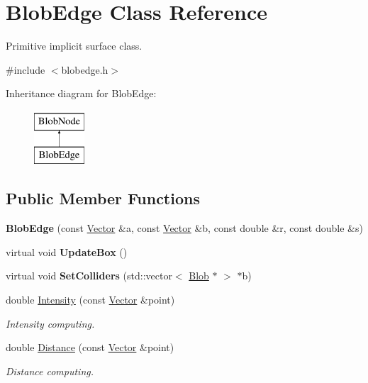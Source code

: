 \hypertarget{class_blob_edge}{
\section{BlobEdge Class Reference}
\label{class_blob_edge}
}


Primitive implicit surface class.  




{\ttfamily \#include $<$blobedge.h$>$}

Inheritance diagram for BlobEdge:\begin{figure}[H]
\begin{center}
\leavevmode
\includegraphics[height=2.000000cm]{class_blob_edge}
\end{center}
\end{figure}
\subsection*{Public Member Functions}
\begin{DoxyCompactItemize}
\item 
\hypertarget{class_blob_edge_af74f4188c371a488f7650f8b1b011209}{
{\bfseries BlobEdge} (const \hyperlink{class_vector}{Vector} \&a, const \hyperlink{class_vector}{Vector} \&b, const double \&r, const double \&s)}
\label{class_blob_edge_af74f4188c371a488f7650f8b1b011209}

\item 
\hypertarget{class_blob_edge_aa13b95bf61f264904b1aed5d8ee75715}{
virtual void {\bfseries UpdateBox} ()}
\label{class_blob_edge_aa13b95bf61f264904b1aed5d8ee75715}

\item 
\hypertarget{class_blob_edge_a0708905d9f6b4b4697ddc21da99b4961}{
virtual void {\bfseries SetColliders} (std::vector$<$ \hyperlink{class_blob}{Blob} $\ast$ $>$ $\ast$b)}
\label{class_blob_edge_a0708905d9f6b4b4697ddc21da99b4961}

\item 
double \hyperlink{class_blob_edge_ae22e73d24227a2daec56d79ccd373c8f}{Intensity} (const \hyperlink{class_vector}{Vector} \&point)
\begin{DoxyCompactList}\small\item\em Intensity computing. \item\end{DoxyCompactList}\item 
double \hyperlink{class_blob_edge_a4b0a4785087b2eccd7cab4c57033376e}{Distance} (const \hyperlink{class_vector}{Vector} \&point)
\begin{DoxyCompactList}\small\item\em Distance computing. \item\end{DoxyCompactList}\end{DoxyCompactItemize}



